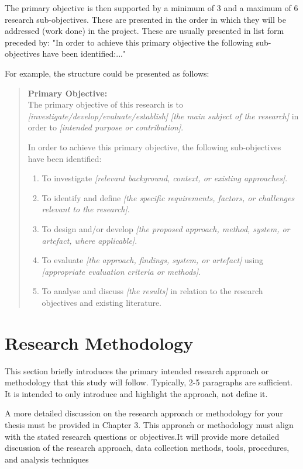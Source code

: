 The primary objective is then supported by a minimum of 3 and a maximum of 6 research sub-objectives. These are presented in the order in which they will be addressed (work done) in the project. These are usually presented in list form preceded by: "In order to achieve this primary objective the following sub-objectives have been identified:..."

For example, the structure could be presented as follows:

\begin{quote}
\textbf{Primary Objective:}\\
The primary objective of this research is to \textit{[investigate/develop/evaluate/establish]} \textit{[the main subject of the research]} in order to \textit{[intended purpose or contribution]}.

\vspace{0.5em}

In order to achieve this primary objective, the following sub-objectives have been identified:
\begin{enumerate}[nosep]
    \item To investigate \textit{[relevant background, context, or existing approaches]}.
    \item To identify and define \textit{[the specific requirements, factors, or challenges relevant to the research]}.
    \item To design and/or develop \textit{[the proposed approach, method, system, or artefact, where applicable]}.
    \item To evaluate \textit{[the approach, findings, system, or artefact]} using \textit{[appropriate evaluation criteria or methods]}.
    \item To analyse and discuss \textit{[the results]} in relation to the research objectives and existing literature.
\end{enumerate}
\end{quote}

\section{Research Methodology}\label{sec:research-methodology}
This section briefly introduces the primary intended research approach or methodology that this study will follow. Typically, 2-5 paragraphs are sufficient. It is intended to only introduce and highlight the approach, not define it.

A more detailed discussion on the research approach or methodology for your thesis must be provided in Chapter 3. This approach or methodology must align with the stated research questions or objectives.It will provide more detailed discussion of the research approach, data collection methods, tools, procedures, and analysis techniques 

